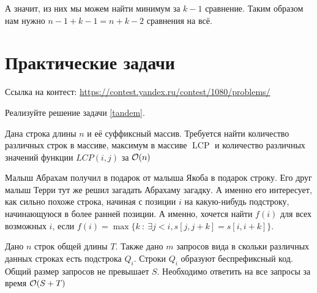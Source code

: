 \documentclass[addpoints]{exam}
\DeclareMathOperator{\LCP}{LCP}
\begin{document}
\begin{questions}
\begin{solution}
А значит, из них мы можем найти минимум за $k-1$ сравнение. Таким образом нам нужно $n-1+k-1=n+k-2$ сравнения на всё.

\end{solution}


\section{Практические задачи}

Ссылка на контест: \url{https://contest.yandex.ru/contest/1080/problems/}

\question[1] Реализуйте решение задачи \ref{tandem}.

\question[1] Дана строка длины $n$ и её суффиксный массив. Требуется найти количество различных строк в массиве, максимум в массиве $\LCP$ и количество различных значений функции $LCP(i,j)$ за $\mathcal{O}(n)$
 
\question[1] Малыш Абрахам получил в подарок от малыша Якоба в подарок строку. Его друг малыш Терри тут же решил загадать Абрахаму загадку. А именно его интересует, как сильно похоже строка, начиная с позиции $i$ на какую-нибудь подстроку, начинающуюся в более ранней позиции. А именно, хочется найти $f(i)$ для всех возможных $i$, если $f(i) = \max\{k\ :\ \exists j<i, s[j,j+k]=s[i,i+k]\}$.

\question[2] Дано $n$ строк общей длины $T$. Также дано $m$ запросов вида в скольки различных данных строках есть подстрока $Q_i$. Строки $Q_i$ образуют беспрефиксный код. Общий размер запросов не превышает $S$. Необходимо ответить на все запросы за время $\mathcal{O}(S + T)$
 
\begin{center}
\pointtable[h][questions]
\end{center}

\end{questions}
\end{document}
